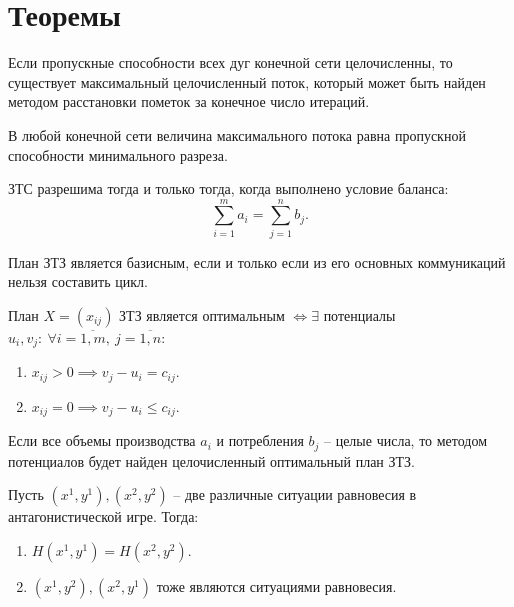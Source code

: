 \section{Теоремы}

\begin{theorem}
	Если пропускные способности всех дуг конечной сети целочисленны, то существует максимальный целочисленный поток, который может быть найден методом расстановки пометок за конечное число итераций.
\end{theorem}

\begin{theorem}
	В любой конечной сети величина максимального потока равна пропускной способности минимального разреза.
\end{theorem}

\begin{theorem}
	ЗТС разрешима тогда и только тогда, когда выполнено условие баланса:
	\[
		\sum_{i=1}^{m} a_i = \sum_{j=1}^{n} b_j.
	\]
\end{theorem}

\begin{theorem}
	План ЗТЗ является базисным, если и только если из его основных коммуникаций нельзя составить цикл.
\end{theorem}

\begin{theorem}
	План $X = (x_{ij} )$ ЗТЗ является оптимальным $\iff \exists $ потенциалы $u_i,v_j: \ \forall i=\overline{1,m} , \ j = \overline{1,n} $:
	\begin{enumerate}
		\item $x_{ij} > 0 \implies v_j - u_i = c_{ij} $.
		\item $x_{ij} = 0 \implies v_j - u_i \leqslant c_{ij} $.
	\end{enumerate}
\end{theorem}

\begin{theorem}
	Если все объемы производства $a_i$ и потребления $b_j$ -- целые числа, то методом потенциалов будет найден целочисленный оптимальный план ЗТЗ.
\end{theorem}

\begin{theorem}
	Пусть $(x^1,y^1),(x^2,y^2)$ -- две различные ситуации равновесия в антагонистической игре. Тогда:
	\begin{enumerate}
		\item $H(x^1,y^1) = H(x^2,y^2)$.
		\item $(x^1,y^2),(x^2,y^1)$ тоже являются ситуациями равновесия.
	\end{enumerate}
\end{theorem}

